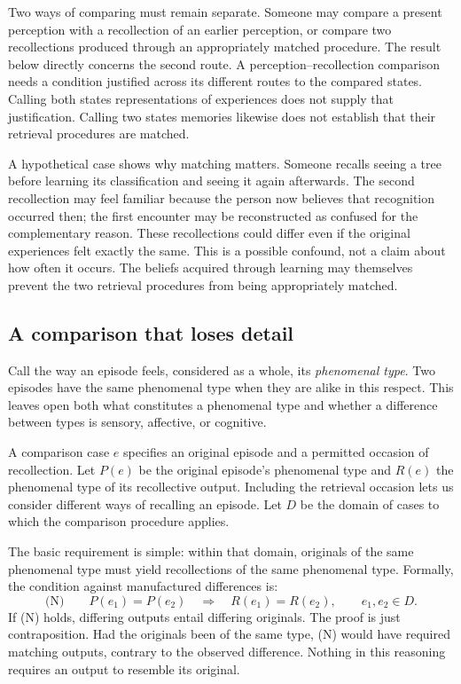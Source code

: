 Two ways of comparing must remain separate. Someone may compare a present perception with a recollection of an earlier perception, or compare two recollections produced through an appropriately matched procedure. The result below directly concerns the second route. A perception–recollection comparison needs a condition justified across its different routes to the compared states. Calling both states representations of experiences does not supply that justification. Calling two states memories likewise does not establish that their retrieval procedures are matched.

A hypothetical case shows why matching matters. Someone recalls seeing a tree before learning its classification and seeing it again afterwards. The second recollection may feel familiar because the person now believes that recognition occurred then; the first encounter may be reconstructed as confused for the complementary reason. These recollections could differ even if the original experiences felt exactly the same. This is a possible confound, not a claim about how often it occurs. The beliefs acquired through learning may themselves prevent the two retrieval procedures from being appropriately matched.

\subsection*{A comparison that loses detail}

Call the way an episode feels, considered as a whole, its \emph{phenomenal type}. Two episodes have the same phenomenal type when they are alike in this respect. This leaves open both what constitutes a phenomenal type and whether a difference between types is sensory, affective, or cognitive.

A comparison case \(e\) specifies an original episode and a permitted occasion of recollection. Let \(P(e)\) be the original episode's phenomenal type and \(R(e)\) the phenomenal type of its recollective output. Including the retrieval occasion lets us consider different ways of recalling an episode. Let \(D\) be the domain of cases to which the comparison procedure applies.

The basic requirement is simple: within that domain, originals of the same phenomenal type must yield recollections of the same phenomenal type. Formally, the condition against manufactured differences is:
\[
\text{(N)}\qquad P(e_1)=P(e_2)\quad\Longrightarrow\quad R(e_1)=R(e_2),\qquad e_1,e_2\in D.
\]
If (N) holds, differing outputs entail differing originals. The proof is just contraposition. Had the originals been of the same type, (N) would have required matching outputs, contrary to the observed difference. Nothing in this reasoning requires an output to resemble its original.

